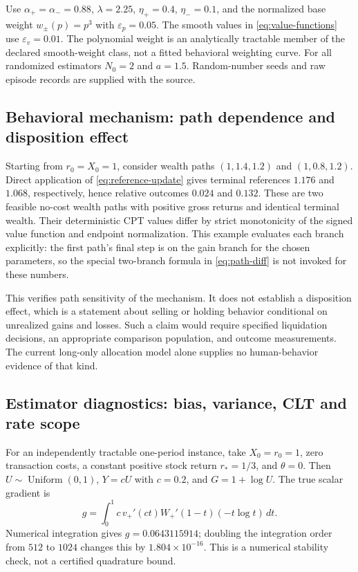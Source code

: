 \documentclass[11pt]{article}
\newcommand{\1}{\mathbf 1}
\newcommand{\eps}{\varepsilon}
\theoremstyle{definition}
\begin{document}
Use $\alpha_+=\alpha_-=0.88$, $\lambda=2.25$, $\eta_+=0.4$, $\eta_-=0.1$, and the normalized base weight $w_\pm(p)=p^3$ with $\eps_p=0.05$. The smooth values in \eqref{eq:value-functions} use $\eps_v=0.01$. The polynomial weight is an analytically tractable member of the declared smooth-weight class, not a fitted behavioral weighting curve. For all randomized estimators $N_0=2$ and $a=1.5$. Random-number seeds and raw episode records are supplied with the source.

\subsection{Behavioral mechanism: path dependence and disposition effect}
Starting from $r_0=X_0=1$, consider wealth paths $(1,1.4,1.2)$ and $(1,0.8,1.2)$. Direct application of \eqref{eq:reference-update} gives terminal references $1.176$ and $1.068$, respectively, hence relative outcomes $0.024$ and $0.132$. These are two feasible no-cost wealth paths with positive gross returns and identical terminal wealth. Their deterministic CPT values differ by strict monotonicity of the signed value function and endpoint normalization. This example evaluates each branch explicitly: the first path's final step is on the gain branch for the chosen parameters, so the special two-branch formula in \eqref{eq:path-diff} is not invoked for these numbers.

This verifies path sensitivity of the mechanism. It does not establish a disposition effect, which is a statement about selling or holding behavior conditional on unrealized gains and losses. Such a claim would require specified liquidation decisions, an appropriate comparison population, and outcome measurements. The current long-only allocation model alone supplies no human-behavior evidence of that kind.

\subsection{Estimator diagnostics: bias, variance, CLT and rate scope}
For an independently tractable one-period instance, take $X_0=r_0=1$, zero transaction costs, a constant positive stock return $r_*=1/3$, and $\theta=0$. Then $U\sim\operatorname{Uniform}(0,1)$, $Y=cU$ with $c=0.2$, and $G=1+\log U$. The true scalar gradient is
\begin{equation}\label{eq:diagnostic-gradient}
 g=\int_0^1c\,v_+'(ct)W_+'(1-t)(-t\log t)\,dt.
\end{equation}
Numerical integration gives $g=0.0643115914$; doubling the integration order from $512$ to $1024$ changes this by $1.804\times10^{-16}$. This is a numerical stability check, not a certified quadrature bound.
\end{document}
